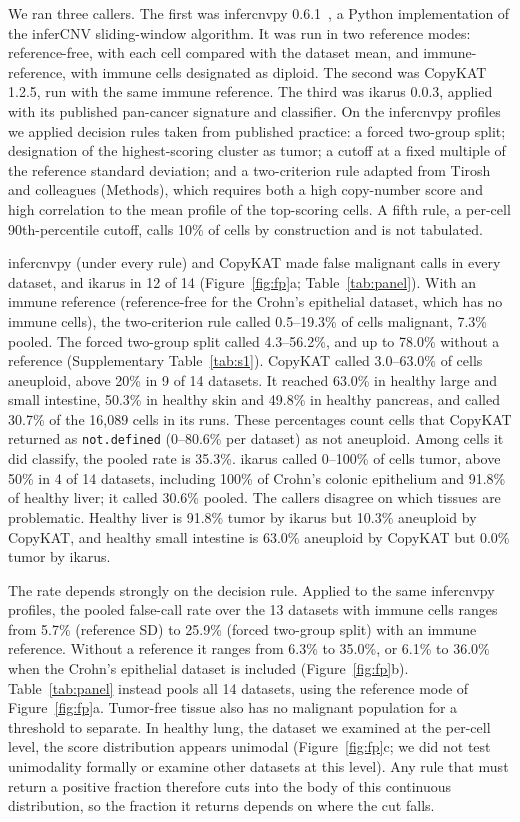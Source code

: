 \documentclass[11pt,letterpaper]{article}
\begin{document}
We ran three callers. The first was infercnvpy 0.6.1~\cite{infercnvpy}, a Python implementation of the inferCNV sliding-window algorithm. It was run in two reference modes: reference-free, with each cell compared with the dataset mean, and immune-reference, with immune cells designated as diploid. The second was CopyKAT 1.2.5, run with the same immune reference. The third was ikarus 0.0.3, applied with its published pan-cancer signature and classifier. On the infercnvpy profiles we applied decision rules taken from published practice: a forced two-group split; designation of the highest-scoring cluster as tumor; a cutoff at a fixed multiple of the reference standard deviation; and a two-criterion rule adapted from Tirosh and colleagues (Methods), which requires both a high copy-number score and high correlation to the mean profile of the top-scoring cells. A fifth rule, a per-cell 90th-percentile cutoff, calls 10\% of cells by construction and is not tabulated.

infercnvpy (under every rule) and CopyKAT made false malignant calls in every dataset, and ikarus in 12 of 14 (Figure~\ref{fig:fp}a; Table~\ref{tab:panel}). With an immune reference (reference-free for the Crohn's epithelial dataset, which has no immune cells), the two-criterion rule called 0.5--19.3\% of cells malignant, 7.3\% pooled. The forced two-group split called 4.3--56.2\%, and up to 78.0\% without a reference (Supplementary Table~\ref{tab:s1}). CopyKAT called 3.0--63.0\% of cells aneuploid, above 20\% in 9 of 14 datasets. It reached 63.0\% in healthy large and small intestine, 50.3\% in healthy skin and 49.8\% in healthy pancreas, and called 30.7\% of the 16{,}089 cells in its runs. These percentages count cells that CopyKAT returned as \texttt{not.defined} (0--80.6\% per dataset) as not aneuploid. Among cells it did classify, the pooled rate is 35.3\%. ikarus called 0--100\% of cells tumor, above 50\% in 4 of 14 datasets, including 100\% of Crohn's colonic epithelium and 91.8\% of healthy liver; it called 30.6\% pooled. The callers disagree on which tissues are problematic. Healthy liver is 91.8\% tumor by ikarus but 10.3\% aneuploid by CopyKAT, and healthy small intestine is 63.0\% aneuploid by CopyKAT but 0.0\% tumor by ikarus.

The rate depends strongly on the decision rule. Applied to the same infercnvpy profiles, the pooled false-call rate over the 13 datasets with immune cells ranges from 5.7\% (reference SD) to 25.9\% (forced two-group split) with an immune reference. Without a reference it ranges from 6.3\% to 35.0\%, or 6.1\% to 36.0\% when the Crohn's epithelial dataset is included (Figure~\ref{fig:fp}b). Table~\ref{tab:panel} instead pools all 14 datasets, using the reference mode of Figure~\ref{fig:fp}a. Tumor-free tissue also has no malignant population for a threshold to separate. In healthy lung, the dataset we examined at the per-cell level, the score distribution appears unimodal (Figure~\ref{fig:fp}c; we did not test unimodality formally or examine other datasets at this level). Any rule that must return a positive fraction therefore cuts into the body of this continuous distribution, so the fraction it returns depends on where the cut falls.
\end{document}
